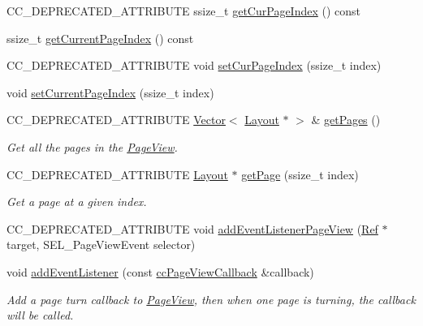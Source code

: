 \begin{DoxyCompactItemize}
\item 
C\+C\+\_\+\+D\+E\+P\+R\+E\+C\+A\+T\+E\+D\+\_\+\+A\+T\+T\+R\+I\+B\+U\+TE ssize\+\_\+t \hyperlink{classui_1_1PageView_af8f0014cd5470f0734d40c945823ea17}{get\+Cur\+Page\+Index} () const
\item 
ssize\+\_\+t \hyperlink{classui_1_1PageView_aad39bcc516543dbd0b8bbf1b57bd2e98}{get\+Current\+Page\+Index} () const
\item 
C\+C\+\_\+\+D\+E\+P\+R\+E\+C\+A\+T\+E\+D\+\_\+\+A\+T\+T\+R\+I\+B\+U\+TE void \hyperlink{classui_1_1PageView_a153c32995f94a646e85bd827387c826f}{set\+Cur\+Page\+Index} (ssize\+\_\+t index)
\item 
void \hyperlink{classui_1_1PageView_a919770a660944565ae72d4cc4b571121}{set\+Current\+Page\+Index} (ssize\+\_\+t index)
\item 
C\+C\+\_\+\+D\+E\+P\+R\+E\+C\+A\+T\+E\+D\+\_\+\+A\+T\+T\+R\+I\+B\+U\+TE \hyperlink{classVector}{Vector}$<$ \hyperlink{classui_1_1Layout}{Layout} $\ast$ $>$ \& \hyperlink{classui_1_1PageView_a85a0a173c08718f0d84a3eb5c8c2c2bb}{get\+Pages} ()
\begin{DoxyCompactList}\small\item\em Get all the pages in the \hyperlink{classui_1_1PageView}{Page\+View}. \end{DoxyCompactList}\item 
C\+C\+\_\+\+D\+E\+P\+R\+E\+C\+A\+T\+E\+D\+\_\+\+A\+T\+T\+R\+I\+B\+U\+TE \hyperlink{classui_1_1Layout}{Layout} $\ast$ \hyperlink{classui_1_1PageView_a0f13817440be39068e46a3c597466268}{get\+Page} (ssize\+\_\+t index)
\begin{DoxyCompactList}\small\item\em Get a page at a given index. \end{DoxyCompactList}\item 
C\+C\+\_\+\+D\+E\+P\+R\+E\+C\+A\+T\+E\+D\+\_\+\+A\+T\+T\+R\+I\+B\+U\+TE void \hyperlink{classui_1_1PageView_a67ca3d93ecbad57aa9ba3d5df1350dbd}{add\+Event\+Listener\+Page\+View} (\hyperlink{classRef}{Ref} $\ast$target, S\+E\+L\+\_\+\+Page\+View\+Event selector)
\item 
void \hyperlink{classui_1_1PageView_a8887593dc71c203af06f8043082d2de4}{add\+Event\+Listener} (const \hyperlink{classui_1_1PageView_a1cbaf2e41005380574beae96ac2bc136}{cc\+Page\+View\+Callback} \&callback)
\begin{DoxyCompactList}\small\item\em Add a page turn callback to \hyperlink{classui_1_1PageView}{Page\+View}, then when one page is turning, the callback will be called. \end{DoxyCompactList}\item 

\end{DoxyCompactItemize}
